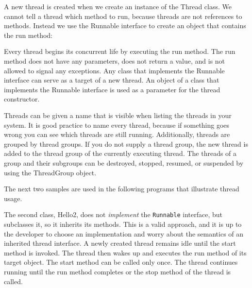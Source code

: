 {A new thread is created when we create an instance of the Thread class. We cannot tell a thread which method to run, because threads are not references to methods. Instead we use the Runnable interface to create an object that contains the run method:

Every thread begins its concurrent life by executing the run method. The run method does not have any parameters, does not return a value, and is not allowed to signal any exceptions.
Any class that implements the Runnable interface can serve as a target of a new thread. An object of a class that implements the Runnable interface is used as a parameter for the thread constructor.

Threads can be given a name that is visible when listing the threads in your system. It is good practice to name every thread, because if something goes wrong you can see which threads are still running.
Additionally, threads are grouped by thread groups. If you do not
supply a thread group, the new thread is added to the thread group of
the currently executing thread. The threads of a group and their
subgroups can be destroyed, stopped, resumed, or suspended by using
the ThreadGroup object. 

The next two samples are used in the following programs that
illustrate thread usage.
 
 
The second class, Hello2, does not \emph{implement} the
\texttt{Runnable} interface, but subclasses it, so it inherits its
methods. This is a valid approach, and it is up to the developer to
choose an implementation and worry about the semantics of an inherited
thread interface.
A newly created thread remains idle until the start method is invoked. The thread then wakes up and executes the run method of its target object. The start method can be called only once. The thread continues running until the run method completes or the stop method of the thread is called.




}
